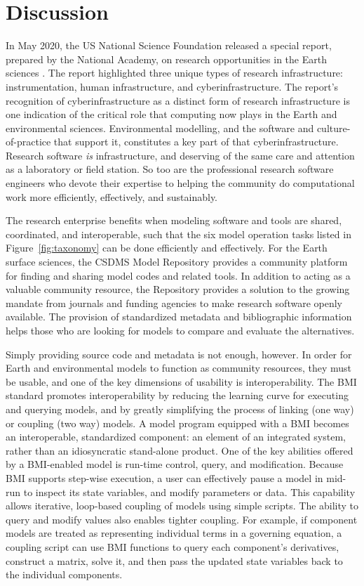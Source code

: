 \documentclass{article} %
\begin{document}
\section{Discussion}
\label{sec:discussion}

In May 2020, the US National Science Foundation released a special report, prepared by the National Academy, on research opportunities in the Earth sciences \citep{nrc2020earth}. The report highlighted three unique types of research infrastructure: instrumentation, human infrastructure, and cyberinfrastructure. The report's recognition of cyberinfrastructure as a distinct form of research infrastructure is one indication of the critical role that computing now plays in the Earth and environmental sciences. Environmental modelling, and the software and culture-of-practice that support it, constitutes a key part of that cyberinfrastructure. Research software \textit{is} infrastructure, and deserving of the same care and attention as a laboratory or field station. So too are the professional research software engineers who devote their expertise to helping the community do computational work more efficiently, effectively, and sustainably.

The research enterprise benefits when modeling  software and tools are shared, coordinated, and interoperable, such that the six model operation tasks listed in Figure~\ref{fig:taxonomy} can be done efficiently and effectively. For the Earth surface sciences, the CSDMS Model Repository provides a community platform for finding and sharing model codes and related tools. In addition to acting as a valuable community resource, the Repository provides a solution to the growing mandate from journals and funding agencies to make research software openly available. The provision of standardized metadata and bibliographic information helps those who are looking for models to compare and evaluate the alternatives.

Simply providing source code and metadata is not enough, however. In order for Earth and environmental models to function as community resources, they must be usable, and one of the key dimensions of usability is interoperability. The BMI standard promotes interoperability by reducing the learning curve for executing and querying models, and by greatly simplifying the process of linking (one way) or coupling (two way) models. A model program equipped with a BMI becomes an interoperable, standardized component: an element of an integrated system, rather than an idiosyncratic stand-alone product. One of the key abilities offered by a BMI-enabled model is run-time control, query, and modification. Because BMI supports step-wise execution, a user can effectively pause a model in mid-run to inspect its state variables, and modify parameters or data. This capability allows iterative, loop-based coupling of models using simple scripts. The ability to query and modify values also enables tighter coupling. For example, if  component models are treated as representing individual terms in a governing equation, a coupling script can use BMI functions to query each component's derivatives, construct a matrix, solve it, and then pass the updated state variables back to the individual components.
\end{document}
